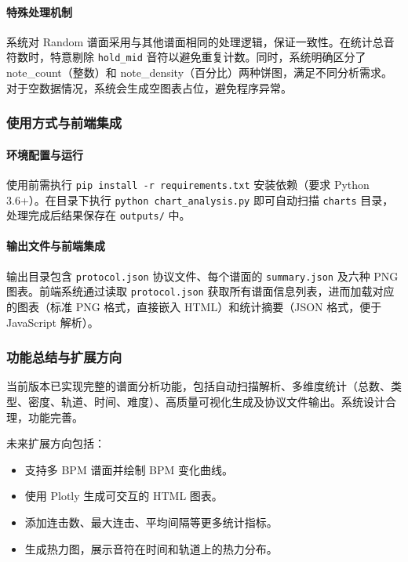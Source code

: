 \documentclass[12pt, a4paper]{article}
\begin{document}
\paragraph{特殊处理机制}
系统对 Random 谱面采用与其他谱面相同的处理逻辑，保证一致性。在统计总音符数时，特意剔除 \texttt{hold\_mid} 音符以避免重复计数。同时，系统明确区分了 note\_count（整数）和 note\_density（百分比）两种饼图，满足不同分析需求。对于空数据情况，系统会生成空图表占位，避免程序异常。

\subsubsection{使用方式与前端集成}

\paragraph{环境配置与运行}
使用前需执行 \texttt{pip install -r requirements.txt} 安装依赖（要求 Python 3.6+）。在目录下执行 \texttt{python chart\_analysis.py} 即可自动扫描 \texttt{charts} 目录，处理完成后结果保存在 \texttt{outputs/} 中。

\paragraph{输出文件与前端集成}
输出目录包含 \texttt{protocol.json} 协议文件、每个谱面的 \texttt{summary.json} 及六种 PNG 图表。前端系统通过读取 \texttt{protocol.json} 获取所有谱面信息列表，进而加载对应的图表（标准 PNG 格式，直接嵌入 HTML）和统计摘要（JSON 格式，便于 JavaScript 解析）。

\subsubsection{功能总结与扩展方向}
当前版本已实现完整的谱面分析功能，包括自动扫描解析、多维度统计（总数、类型、密度、轨道、时间、难度）、高质量可视化生成及协议文件输出。系统设计合理，功能完善。

未来扩展方向包括：
\begin{itemize}
    \item 支持多 BPM 谱面并绘制 BPM 变化曲线。
    \item 使用 Plotly 生成可交互的 HTML 图表。
    \item 添加连击数、最大连击、平均间隔等更多统计指标。
    \item 生成热力图，展示音符在时间和轨道上的热力分布。
\end{itemize}
\end{document}
